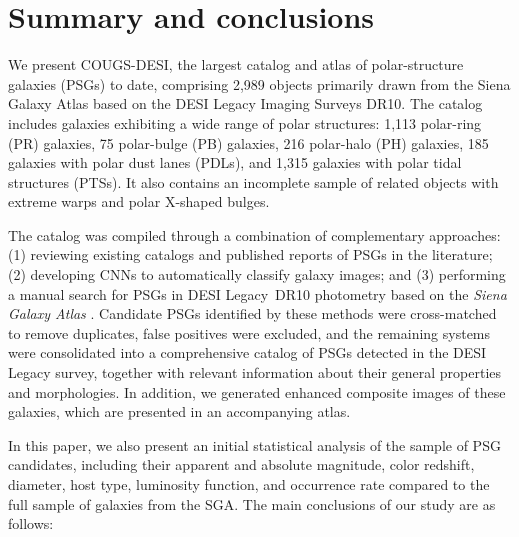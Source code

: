 \documentclass{aa}
\begin{document}
\section{Summary and conclusions} \label{sec:summary}

We present COUGS-DESI, the largest catalog and atlas of polar-structure galaxies (PSGs) to date, comprising 2,989 objects primarily drawn from the Siena Galaxy Atlas \citep{2023ApJS..269....3M} based on the DESI Legacy Imaging Surveys \citep{2019AJ....157..168D} DR10. The catalog includes galaxies exhibiting a wide range of polar structures: 1,113 polar-ring (PR) galaxies, 75 polar-bulge (PB) galaxies, 216 polar-halo (PH) galaxies, 185 galaxies with polar dust lanes (PDLs), and 1,315 galaxies with polar tidal structures (PTSs). It also contains an incomplete sample of related objects with extreme warps and polar X-shaped bulges.

The catalog was compiled through a combination of complementary approaches: (1) reviewing existing catalogs and published reports of PSGs in the literature; (2) developing CNNs to automatically classify galaxy images; and (3) performing a manual search for PSGs in DESI Legacy~DR10 photometry based on the \textit{Siena Galaxy Atlas} \citep{2023ApJS..269....3M}. Candidate PSGs identified by these methods were cross-matched to remove duplicates, false positives were excluded, and the remaining systems were consolidated into a comprehensive catalog of PSGs detected in the DESI Legacy survey, together with relevant information about their general properties and morphologies. In addition, we generated enhanced composite images of these galaxies, which are presented in an accompanying atlas. 

In this paper, we also present an initial statistical analysis of the sample of PSG candidates, including their apparent and absolute magnitude, color redshift, diameter, host type, luminosity function, and occurrence rate compared to the full sample of galaxies from the SGA. The main conclusions of our study are as follows:
\end{document}
